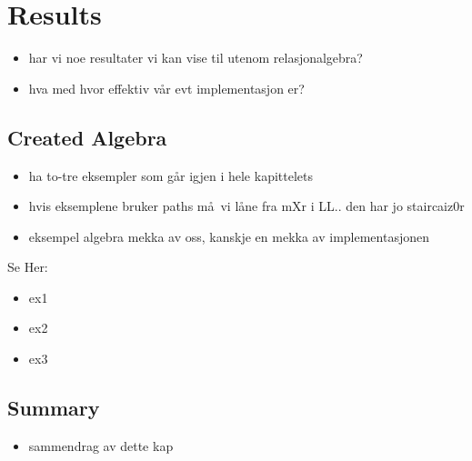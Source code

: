 \chapter{Results}
\label{chapter:results}
\begin{itemize}
  \item har vi noe resultater vi kan vise til utenom relasjonalgebra?
  \item hva med hvor effektiv v\aa r evt implementasjon er?
\end{itemize}

\section{Created Algebra}
\begin{itemize}
  \item ha to-tre eksempler som g\aa r igjen i hele kapittelets
  \item hvis eksemplene bruker paths m\aa~vi l\aa ne fra mXr i LL.. den har jo staircaiz0r
  \item eksempel algebra mekka av oss, kanskje en mekka av implementasjonen
\end{itemize}

Se Her:
\begin{itemize}
  \item ex1
  \item ex2
  \item ex3
\end{itemize}






\section{Summary}
\label{sect:res:summary}
\begin{itemize}
  \item sammendrag av dette kap
\end{itemize}
